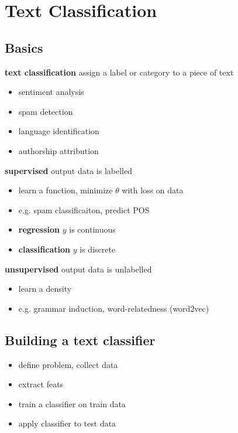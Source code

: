 \documentclass[]{article}
\theoremstyle{definition}
\begin{document}
\section{Text Classification}%
\label{sec:text_classification}

\subsection{Basics}%
\label{sub:basics}

\textbf{text classification} assign a label or category to a piece of text
\begin{itemize}
    \item sentiment analysis
    \item spam detection
    \item language identification
    \item authorship attribution
\end{itemize}

\textbf{supervised} output data is labelled
\begin{itemize}
    \item learn a function, minimize $\theta$ with loss on data
    \item e.g. spam classificaiton, predict POS
    \item \textbf{regression} $y$ is continuous
    \item \textbf{classification} $y$ is discrete
\end{itemize}
\textbf{unsupervised} output data is unlabelled
\begin{itemize}
    \item learn a density
    \item e.g. grammar induction, word-relatedness (word2vec)
\end{itemize}

\subsection{Building a text classifier}%
\label{ssub:building_a_text_classifier}

\begin{itemize}
    \item define problem, collect data
    \item extract feats
    \item train a classifier on train data
    \item apply classifier to test data
\end{itemize}
\end{document}
